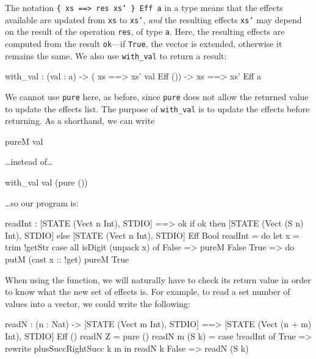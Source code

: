 \noindent
The notation \texttt{\{ xs ==> {res} xs' \} Eff a} in a type means that the
effects available are updated from \texttt{xs} to \texttt{xs'}, \emph{and}
the resulting effects \texttt{xs'} may depend on the result of the operation
\texttt{res}, of type \texttt{a}. Here, the resulting effects are computed
from the result \texttt{ok}---if \texttt{True}, the vector is extended, otherwise
it remains the same. We also use \texttt{with\_val} to return a result:

\begin{code}
with_val : (val : a) -> 
           ({ xs ==> xs' val } Eff ()) -> { xs ==> xs' } Eff a
\end{code}

\noindent
We cannot use \texttt{pure} here, as before, since \texttt{pure} does not allow
the returned value to update the effects list. The purpose of \texttt{with\_val}
is to update the effects before returning. As a shorthand, we can write

\begin{code}
pureM val
\end{code}

\ldots instead of\ldots

\begin{code}
with_val val (pure ())
\end{code}

\noindent
\ldots so our program is:

\begin{code}
readInt : { [STATE (Vect n Int), STDIO] ==>
            {ok} if ok then [STATE (Vect (S n) Int), STDIO]
                       else [STATE (Vect n Int), STDIO] }
          Eff Bool
readInt = do let x = trim !getStr
             case all isDigit (unpack x) of
                  False => pureM False
                  True => do putM (cast x :: !get)
                             pureM True
\end{code}

\noindent
When using the function, we will naturally have to check its return value
in order to know what the new set of effects is. For example, to read a set
number of values into a vector, we could write the following:

\begin{code}
readN : (n : Nat) ->
        { [STATE (Vect m Int), STDIO] ==>
          [STATE (Vect (n + m) Int), STDIO] } Eff ()
readN Z = pure ()
readN {m} (S k) = case !readInt of
                      True => rewrite plusSuccRightSucc k m in readN k
                      False => readN (S k)
\end{code}

